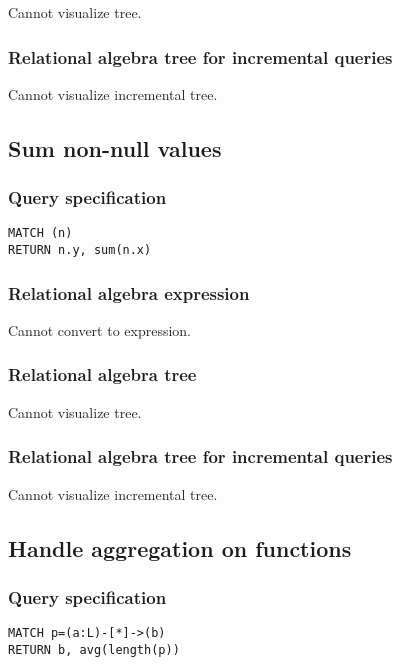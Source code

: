 Cannot visualize tree.

\subsubsection*{Relational algebra tree for incremental queries}

Cannot visualize incremental tree.

\subsection{Sum non-null values}

\subsubsection*{Query specification}

\begin{lstlisting}
MATCH (n)
RETURN n.y, sum(n.x)
\end{lstlisting}

\subsubsection*{Relational algebra expression}

Cannot convert to expression.

\subsubsection*{Relational algebra tree}

Cannot visualize tree.

\subsubsection*{Relational algebra tree for incremental queries}

Cannot visualize incremental tree.

\subsection{Handle aggregation on functions}

\subsubsection*{Query specification}

\begin{lstlisting}
MATCH p=(a:L)-[*]->(b)
RETURN b, avg(length(p))
\end{lstlisting}

